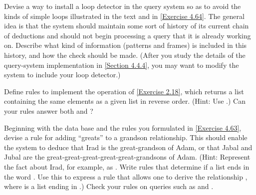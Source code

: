\begin{exercise}
	\label{Exercise 4.67}
	Devise a way to install a loop detector in the query system so as to avoid the kinds of simple loops illustrated in the text and in \cref{Exercise 4.64}.
	The general idea is that the system should maintain some sort of history of its current chain of deductions and should not begin processing a query that it is already working on.
	Describe what kind of information (patterns and frames) is included in this history, and how the check should be made.
	(After you study the details of the query-system implementation in \cref{Section 4.4.4}, you may want to modify the system to include your loop detector.)
\end{exercise}



\begin{exercise}
	\label{Exercise 4.68}
	Define rules to implement the  operation of \cref{Exercise 2.18}, which returns a list containing the same elements as a given list in reverse order.
	(Hint: Use .)
	Can your rules answer both  and  ?
\end{exercise}



\begin{exercise}
	\label{Exercise 4.69}
	Beginning with the data base and the rules you formulated in \cref{Exercise 4.63}, devise a rule for adding “greats” to a grandson relationship.
	This should enable the system to deduce that Irad is the great-grandson of Adam, or that Jabal and Jubal are the great-great-great-great-great-grandsons of Adam.
	(Hint:
	Represent the fact about Irad, for example, as .
	Write rules that determine if a list ends in the word .
	Use this to express a rule that allows one to derive the relationship , where  is a list ending in .)
	Check your rules on queries such as  and .
\end{exercise}
